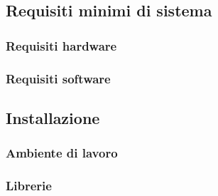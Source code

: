 \subsection{Requisiti minimi di sistema}

	\subsubsection{Requisiti hardware}
	
	\subsubsection{Requisiti software}
	
\subsection{Installazione}

	\subsubsection{Ambiente di lavoro}

	\subsubsection{Librerie}
